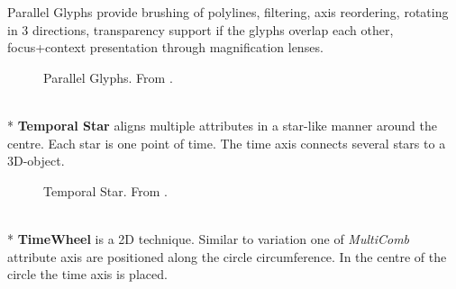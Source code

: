 Parallel Glyphs provide brushing of polylines, filtering, axis reordering, rotating in 3 directions, transparency support if the glyphs overlap each other, focus+context presentation through magnification lenses.
\begin{figure}[H]
    \centering
    \caption{Parallel Glyphs. From \cite{Aigner2011}.}
    \label{fig:parallelglyphs}
\end{figure}
\\*
\textbf{Temporal Star} aligns multiple attributes in a star-like manner around the centre. Each star is one point of time. The time axis connects several stars to a 3D-object.
\begin{figure}[H]
    \centering
    \caption{Temporal Star. From \cite{Aigner2011}.}
    \label{fig:temporalstar}
\end{figure}
\\*
\textbf{TimeWheel} is a 2D technique. Similar to variation one of \textit{MultiComb} attribute axis are positioned along the circle circumference. In the centre of the circle the time axis is placed. 
